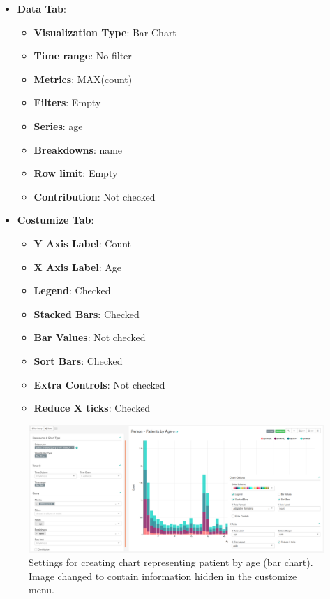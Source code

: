 \documentclass[]{book}
\providecommand{\tightlist}{%
  \setlength{\itemsep}{0pt}\setlength{\parskip}{0pt}}
\begin{document}
\begin{itemize}
\tightlist
\item
  \textbf{Data Tab}:

  \begin{itemize}
  \tightlist
  \item
    \textbf{Visualization Type}: Bar Chart
  \item
    \textbf{Time range}: No filter
  \item
    \textbf{Metrics}: MAX(count)
  \item
    \textbf{Filters}: Empty
  \item
    \textbf{Series}: age
  \item
    \textbf{Breakdowns}: name
  \item
    \textbf{Row limit}: Empty
  \item
    \textbf{Contribution}: Not checked
  \end{itemize}
\item
  \textbf{Costumize Tab}:

  \begin{itemize}
  \tightlist
  \item
    \textbf{Y Axis Label}: Count
  \item
    \textbf{X Axis Label}: Age
  \item
    \textbf{Legend}: Checked
  \item
    \textbf{Stacked Bars}: Checked
  \item
    \textbf{Bar Values}: Not checked
  \item
    \textbf{Sort Bars}: Checked
  \item
    \textbf{Extra Controls}: Not checked
  \item
    \textbf{Reduce X ticks}: Checked
  \end{itemize}
\end{itemize}

\begin{figure}
\includegraphics[width=1\linewidth]{images/personPatientsByAge} \caption{Settings for creating chart representing patient by age (bar chart). Image changed to contain information hidden in the customize menu.}\label{fig:personPatientsByAge}
\end{figure}
\end{document}

